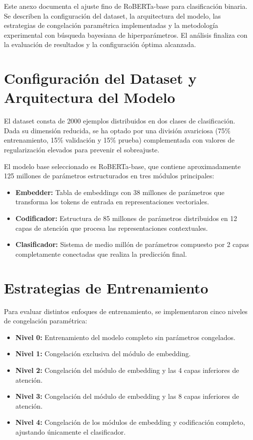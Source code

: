 Este anexo documenta el ajuste fino de RoBERTa-base para clasificación binaria. Se describen la configuración del dataset, la arquitectura del modelo, las estrategias de congelación paramétrica implementadas y la metodología experimental con búsqueda bayesiana de hiperparámetros. El análisis finaliza con la evaluación de resultados y la configuración óptima alcanzada.

\section{Configuración del Dataset y Arquitectura del Modelo}

El dataset consta de 2000 ejemplos distribuidos en dos clases de clasificación. Dada su dimensión reducida, se ha optado por una división avariciosa (75\% entrenamiento, 15\% validación y 15\% prueba) complementada con valores de regularización elevados para prevenir el sobreajuste.

El modelo base seleccionado es RoBERTa-base, que contiene aproximadamente 125 millones de parámetros estructurados en tres módulos principales:

\begin{itemize}
  \item \textbf{Embedder:} Tabla de embeddings con 38 millones de parámetros que transforma los tokens de entrada en representaciones vectoriales.
  \item \textbf{Codificador:} Estructura de 85 millones de parámetros distribuidos en 12 capas de atención que procesa las representaciones contextuales.
  \item \textbf{Clasificador:} Sistema de medio millón de parámetros compuesto por 2 capas completamente conectadas que realiza la predicción final. 
\end{itemize}

\section{Estrategias de Entrenamiento}

Para evaluar distintos enfoques de entrenamiento, se implementaron cinco niveles de congelación paramétrica:

\begin{itemize}
  \item \textbf{Nivel 0:} Entrenamiento del modelo completo sin parámetros congelados.
  \item \textbf{Nivel 1:} Congelación exclusiva del módulo de embedding.
  \item \textbf{Nivel 2:} Congelación del módulo de embedding y las 4 capas inferiores de atención.
  \item \textbf{Nivel 3:} Congelación del módulo de embedding y las 8 capas inferiores de atención.
  \item \textbf{Nivel 4:} Congelación de los módulos de embedding y codificación completo, ajustando únicamente el clasificador. 
\end{itemize}

